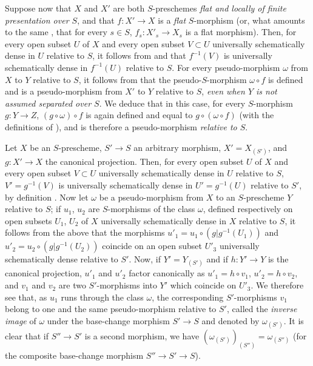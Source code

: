 \begin{env}[20.5.7]
\label{IV.20.5.7}
Suppose now that $X$ and $X'$ are both $S$-preschemes \emph{flat and locally of finite presentation over $S$}, and that $f:X'\to X$ is a \emph{flat} $S$-morphism (or, what amounts to the same , that for every $s\in S$, $f_s:X'_s\to X_s$ is a flat morphism).
Then, for every open subset $U$ of $X$ and every open subset $V\subset U$ universally schematically dense in $U$ relative to $S$, it follows from  and  that $f^{-1}(V)$ is universally schematically dense in $f^{-1}(U)$ relative to $S$.
For every pseudo-morphism $\omega$ from $X$ to $Y$ relative to $S$, it follows from  that the pseudo-$S$-morphism $\omega\circ f$ is defined and is a pseudo-morphism from $X'$ to $Y$ relative to $S$, \emph{even when $Y$ is not assumed separated over $S$}.
We deduce that in this case, for every $S$-morphism $g:Y\to Z$, $(g\circ\omega)\circ f$ is again defined and equal to $g\circ(\omega\circ f)$ (with the definitions of ), and is therefore a pseudo-morphism \emph{relative to $S$}.
\end{env}

\begin{env}[20.5.8]
\label{IV.20.5.8}
Let $X$ be an $S$-prescheme, $S'\to S$ an arbitrary morphism, $X'=X_{(S')}$, and $g:X'\to X$ the canonical projection.
Then, for every open subset $U$ of $X$ and every open subset $V\subset U$ universally schematically dense in $U$ relative to $S$, $V'=g^{-1}(V)$ is universally schematically dense in $U'=g^{-1}(U)$ relative to $S'$, by definition .
Now let $\omega$ be a pseudo-morphism from $X$ to an $S$-prescheme $Y$ relative to $S$; if $u_1$, $u_2$ are $S$-morphisms of the class $\omega$, defined respectively on open subsets $U_1$, $U_2$ of $X$ universally schematically dense in $X$ relative to $S$, it follows from the above that the morphisms $u'_1=u_1\circ(g|g^{-1}(U_1))$ and $u'_2=u_2\circ(g|g^{-1}(U_2))$ coincide on an open subset $U'_3$ universally schematically dense relative to $S'$.
Now, if $Y'=Y_{(S')}$ and if $h:Y'\to Y$ is the canonical projection, $u'_1$ and $u'_2$ factor canonically as $u'_1=h\circ v_1$, $u'_2=h\circ v_2$, and $v_1$ and $v_2$ are two $S'$-morphisms into $Y'$ which coincide on $U'_3$.
We therefore see that, as $u_1$ runs through the class $\omega$, the corresponding $S'$-morphisms $v_1$ belong to one and the same pseudo-morphism relative to $S'$, called the \emph{inverse image} of $\omega$ under the base-change morphism $S'\to S$ and denoted by $\omega_{(S')}$.
It is clear that if $S''\to S'$ is a second morphism, we have $(\omega_{(S')})_{(S'')}=\omega_{(S'')}$ (for the composite base-change morphism $S''\to S'\to S$).
\end{env}

